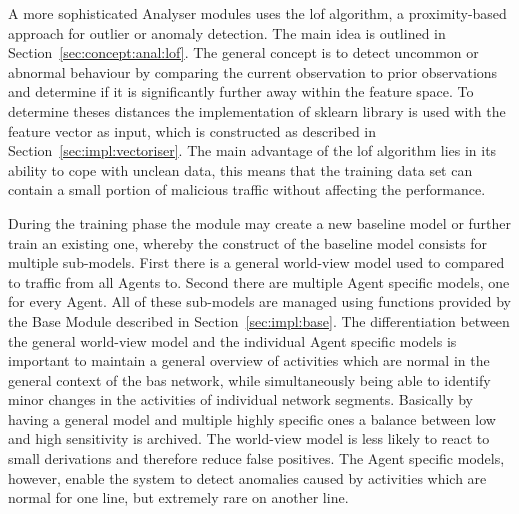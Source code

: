 \begin{comment}
	\item using this feature vector 2 models are trained per agent window
		\subitem one agent specific model
		\subitem one world model, which is trained using data from all agents (aka. the whole network)
	\item purpose of the agent model is to be able to detect traffic leakage
		\subitem i.e. traffic that is normal for one line (e.g. light switches and motion sensors) suddenly occurs in the line responsible for \gls{hvac} control
		\subitem agent model is highly trained and most probably highly sensitive, but can detect unusual behaviour which is normal for the network but not for the line
		\subitem world model is more general and not as sensitive, but cannot distinguish between purposes of lines
	\item analyser module stores 1 for being an outlier or 0 for not being an outlier in the \gls{influxdb} per window
		\subitem threshold is decided in analyser
		\subitem easier monitoring, but data get mangled doing this
		\subitem better might be to store the relative distance (output of \gls{lof}) as well
\end{itemize}
\end{comment}

A more sophisticated Analyser modules uses the \gls{lof} algorithm, a proximity-based approach for outlier or anomaly detection.
The main idea is outlined in Section~\ref{sec:concept:anal:lof}. The general concept is to detect uncommon or abnormal behaviour by comparing the current observation to prior observations and determine if it is significantly further away within the feature space.
To determine theses distances the  implementation of \gls{sklearn} library is used with the feature vector as input, which is constructed as described in Section~\ref{sec:impl:vectoriser}.
The main advantage of the \gls{lof} algorithm lies in its ability to cope with unclean data, this means that the training data set can contain a small portion of malicious traffic without affecting the performance.

During the training phase the module may create a new baseline model or further train an existing one, whereby the construct of the baseline model consists for multiple sub-models. First there is a general world-view model used to compared to traffic from all Agents to. Second there are multiple Agent specific models, one for every Agent. All of these sub-models are managed using functions provided by the Base Module described in Section~\ref{sec:impl:base}.
The differentiation between the general world-view model and the individual Agent specific models is important to maintain a general overview of activities which are normal in the general context of the \gls{bas} network, while simultaneously being able to identify minor changes in the activities of individual network segments.
Basically by having a general model and multiple highly specific ones a balance between low and high sensitivity is archived. 
The world-view model is less likely to react to small derivations and therefore reduce false positives. The Agent specific models, however, enable the system to detect anomalies caused by activities which are normal for one line, but extremely rare on another line.

